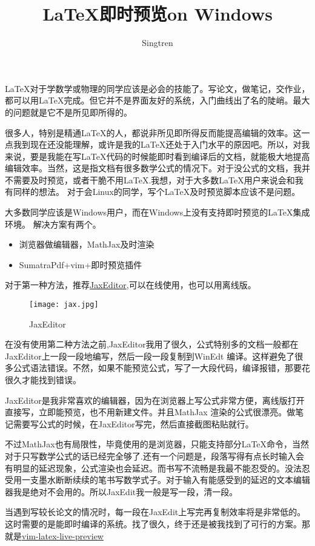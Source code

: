 \documentclass[UTF-8]{ctexart}
\begin{document}
\author{Singtren}
\title{LaTeX即时预览on Windows}
\maketitle
LaTeX对于学数学或物理的同学应该是必会的技能了。写论文，做笔记，交作业，都可以用LaTeX完成。但它并不是界面友好的系统，入门曲线出了名的陡峭。最大的问题就是它不是所见即所得的。

很多人，特别是精通LaTeX的人，都说非所见即所得反而能提高编辑的效率。这一点我到现在还没能理解，或许是我的LaTeX还处于入门水平的原因吧。所以，对我来说，要是我能在写LaTeX代码的时候能即时看到编译后的文档，就能极大地提高编辑效率。当然，这是指文档有很多数学公式的情况下。对于没公式的文档，我并不需要及时预览，或者干脆不用LaTeX.我想，对于大多数LaTeX用户来说会和我有同样的想法。
对于会Linux的同学，写个LaTeX及时预览脚本应该不是问题。

大多数同学应该是Windows用户，而在Windows上没有支持即时预览的LaTeX集成环境。
解决方案有两个。

\begin{itemize}
\item 浏览器做编辑器，MathJax及时渲染
\item SumatraPdf+vim+即时预览插件
\end{itemize}
对于第一种方法，推荐\href{https://zohooo.github.io/jaxedit/}{JaxEditor},可以在线使用，也可以用离线版。
\begin{figure}[]
	\centering
	\texttt{[image: jax.jpg]}
	\caption{JaxEditor}
\end{figure}
在没有使用第二种方法之前,JaxEditor我用了很久，公式特别多的文档一般都在JaxEditor上一段一段地编写，然后一段一段复制到WinEdt 编译。这样避免了很多公式语法错误。不然，如果不能预览公式，写了一大段代码，编译报错，那要花很久才能找到错误。

JaxEditor是我非常喜欢的编辑器，因为在浏览器上写公式非常方便，离线版打开直接写，立即能预览，也不用新建文件。并且MathJax 渲染的公式很漂亮。做笔记需要写公式的时候，在JaxEditor写完，然后直接截图粘贴就行。

不过MathJax也有局限性，毕竟使用的是浏览器，只能支持部分LaTeX命令，当然对于只写数学公式的话已经完全够了.还有一个问题是，段落写得有点长时输入会有明显的延迟现象，公式渲染也会延迟。而书写不流畅是我最不能忍受的。没法忍受用一支墨水断断续续的笔书写数学式子。对于输入有能感受到的延迟的文本编辑器我是绝对不会用的。所以JaxEdit我一般是写一段，清一段。

当遇到写较长论文的情况时，每一段在JaxEdit上写完再复制效率将是非常低的。这时需要的是能即时编译的系统。找了很久，终于还是被我找到了可行的方案。那就是\href{https://github.com/xuhdev/vim-latex-live-preview}{vim-latex-live-preview}
\end{document}
